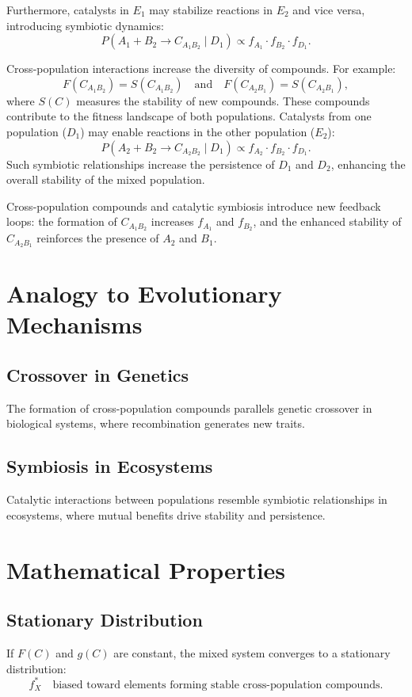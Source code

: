 \documentclass[entropy,article,submit,pdftex,moreauthors]{Definitions/mdpi}
\begin{document}
Furthermore, catalysts in \( E_1 \) may stabilize reactions in \( E_2 \) and vice versa, introducing symbiotic dynamics:
\[
P(A_1 + B_2 \to C_{A_1B_2} \mid D_1) \propto f_{A_1} \cdot f_{B_2} \cdot f_{D_1}.
\]

Cross-population interactions increase the diversity of compounds. For example:
\[
F(C_{A_1B_2}) = S(C_{A_1B_2}) \quad \text{and} \quad F(C_{A_2B_1}) = S(C_{A_2B_1}),
\]
where \( S(C) \) measures the stability of new compounds. These compounds contribute to the fitness landscape of both populations. Catalysts from one population (\( D_1 \)) may enable reactions in the other population (\( E_2 \)):
\[
P(A_2 + B_2 \to C_{A_2B_2} \mid D_1) \propto f_{A_2} \cdot f_{B_2} \cdot f_{D_1}.
\]
Such symbiotic relationships increase the persistence of \( D_1 \) and \( D_2 \), enhancing the overall stability of the mixed population.

Cross-population compounds and catalytic symbiosis introduce new feedback loops: the formation of \( C_{A_1B_2} \) increases \( f_{A_1} \) and \( f_{B_2} \), and the enhanced stability of \( C_{A_2B_1} \) reinforces the presence of \( A_2 \) and \( B_1 \).

\section{Analogy to Evolutionary Mechanisms}

\subsection*{Crossover in Genetics}
The formation of cross-population compounds parallels genetic crossover in biological systems, where recombination generates new traits.

\subsection*{Symbiosis in Ecosystems}
Catalytic interactions between populations resemble symbiotic relationships in ecosystems, where mutual benefits drive stability and persistence.

\section{Mathematical Properties}

\subsection*{Stationary Distribution}
If \( F(C) \) and \( g(C) \) are constant, the mixed system converges to a stationary distribution:
\[
f_X^* \quad \text{biased toward elements forming stable cross-population compounds.}
\]
\end{document}
